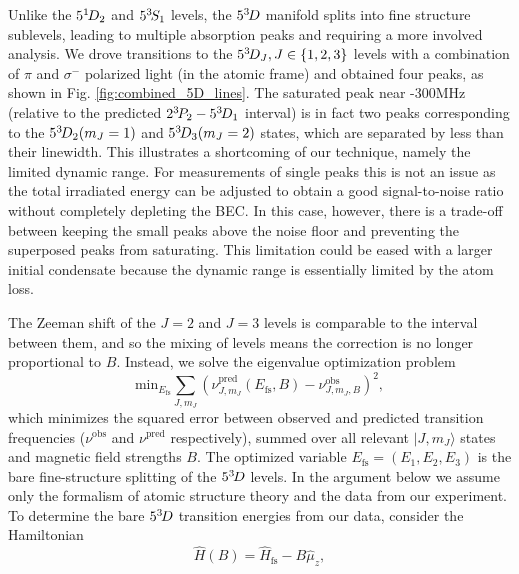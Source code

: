 Unlike the $5^{1\!} D_2$ and $5^{3\!} S_1$ levels, the $5^{3\!} D$ manifold splits into fine structure sublevels, leading to multiple absorption peaks and requiring a more involved analysis.
	We drove transitions to the $5^{3\!} D_J, J\in\{1,2,3\}$ levels with a combination of $\pi$ and $\sigma^-$ polarized light (in the atomic frame) and obtained four peaks, as shown in Fig.
	\ref{fig:combined_5D_lines}.
	The saturated peak near -300MHz (relative to the predicted $2^{3\!} P_2 - 5^{3\!} D_1$ interval) is in fact two peaks corresponding to the $5^{3\!} D_2(m_J=1)$ and $5^{3\!} D_3(m_J=2)$ states, which are separated by less than their linewidth.
	This illustrates a shortcoming of our technique, namely the limited dynamic range.
	For measurements of single peaks this is not an issue as the total irradiated energy can be adjusted to obtain a good signal-to-noise ratio without completely depleting the BEC.
	In this case, however, there is a trade-off between keeping the small peaks above the noise floor and preventing the superposed peaks from saturating.
	This limitation could be eased with a larger initial condensate because the dynamic range is essentially limited by the atom loss.

The Zeeman shift of the $J=2$ and $J=3$ levels is comparable to the interval between them, and so the mixing of levels means the correction is no longer proportional to $B$.
	Instead, we solve the eigenvalue optimization problem 
%
\begin{equation}
\textrm{min}_{E_{\textrm{fs}}} \sum_{J,m_J} \left(\nu_{{J,m_J}}^{\textrm{{pred}}}(E_{\textrm{fs}},B) - \nu_{{J,m_J,B}}^{\textrm{{obs}}}\right)^2,
\label{eqn:opt-problem}
\end{equation}
%
which minimizes the squared error between observed and predicted transition frequencies ($\nu^{\textrm{{obs}}}$ and $\nu^{{\textrm{pred}}}$ respectively), summed over all relevant $|J,m_J\rangle$ states and magnetic field strengths $B$.
	The optimized variable $E_{\textrm{fs}}=(E_1,E_2,E_3)$ is the bare fine-structure splitting of the $5^{3\!} D$ levels.
	In the argument below we assume only the formalism of atomic structure theory and the data from our experiment.
	To determine the bare $5^{3\!} D$ transition energies from our data, consider the Hamiltonian
%
\begin{equation}
    \hat{H}(B) = \hat{H}_{\textrm{fs}} - B\hat{\mu}_z,
    \label{eqn:hamiltonian}
\end{equation}
%

